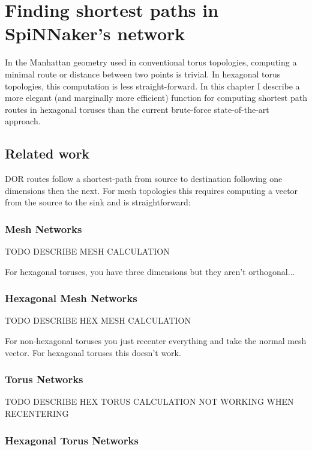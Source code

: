 \chapter{Finding shortest paths in SpiNNaker's network}
	
	In the Manhattan geometry used in conventional torus topologies, computing a
	minimal route or distance between two points is trivial. In hexagonal torus
	topologies, this computation is less straight-forward. In this chapter I
	describe a more elegant (and marginally more efficient) function for
	computing shortest path routes in hexagonal toruses than the current
	brute-force state-of-the-art approach.
	
	\section{Related work}
		
		DOR routes follow a shortest-path from source to destination following one
		dimensions then the next. For mesh topologies this requires computing a
		vector from the source to the sink and is straightforward:
		
		\subsection{Mesh Networks}
			
			TODO DESCRIBE MESH CALCULATION
			
			For hexagonal toruses, you have three dimensions but they aren't
			orthogonal... \cite{patel15}
		
		\subsection{Hexagonal Mesh Networks}
			
			TODO DESCRIBE HEX MESH CALCULATION
			
			For non-hexagonal toruses you just recenter everything and take the normal
			mesh vector. For hexagonal toruses this doesn't work.
		
		\subsection{Torus Networks}
			
			TODO DESCRIBE HEX TORUS CALCULATION NOT WORKING WHEN RECENTERING
		
		\subsection{Hexagonal Torus Networks}
		
